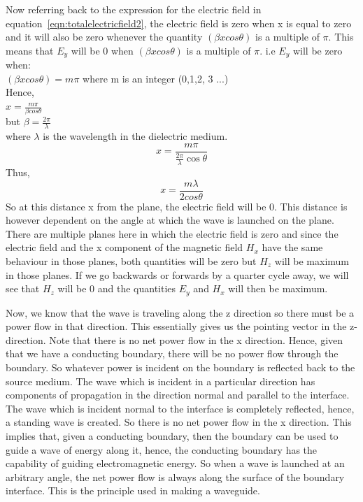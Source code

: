 Now referring back to the expression for the electric field in equation~\ref{eqn:totalelectricfield2}, the electric field is zero when x is equal to zero and it will also be zero whenever the quantity $(\beta xcos\theta)$ is a multiple of $\pi$. This means that $E_y$ will be 0 when $(\beta xcos\theta)$ is a multiple of $\pi$. i.e $E_y$ will be zero when:\\
$(\beta xcos\theta) = m\pi$     where m is an integer (0,1,2, 3 ...)\\ 
Hence,\\
$ x = \frac{m\pi}{\beta cos\theta}$   \\ 
but $\beta = \frac{2\pi}{\lambda}$ \\
where $\lambda$ is the wavelength in the dielectric medium.
\begin{equation*}
x =\frac{m\pi}{\frac{2\pi}{\lambda}\cos\theta}
\end{equation*} 
Thus,
\begin{equation}
x = \frac{m\lambda}{2cos\theta}
\end{equation}
So at this distance x from the plane, the electric field will be 0. This distance is however dependent on the angle at which the wave is launched on the plane. There are multiple planes here in which the electric field is zero and since the electric field and the x component of the magnetic field $H_x$ have the same behaviour in those planes, both quantities will be zero but $H_z$ will be maximum in those planes. If we go backwards or forwards by a quarter cycle away, we will see that $H_z$ will be 0 and the quantities $E_y$ and $H_x$ will then be maximum.

Now, we know that the wave is traveling along the z direction so there must be a power flow in that direction. This essentially gives us the pointing vector in the z-direction. Note that there is no net power flow in the x direction. Hence, given that we have a conducting boundary, there will be no power flow through the boundary. So whatever power is incident on the boundary is reflected back to the source medium. The wave which is incident in a particular direction has components of propagation in the direction normal and parallel to the interface. The wave which is incident normal to the interface is completely reflected, hence, a standing wave is created. So there is no net power flow in the x direction. This implies that, given a conducting boundary, then the boundary can be used to guide a wave of energy along it, hence, the conducting boundary has the capability of guiding electromagnetic energy. So when a wave is launched at an arbitrary angle, the net power flow is always along the surface of the boundary interface. This is the principle used in making a waveguide. 

